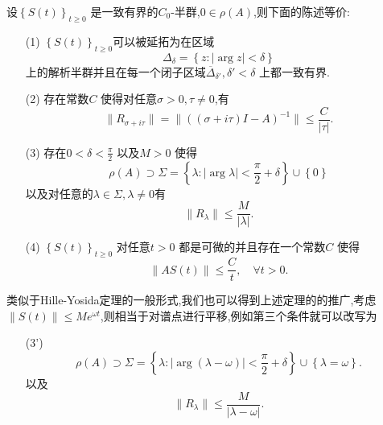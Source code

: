   \begin{theorem}[解析半群的性质]
    设$\left\{S(t)\right\} _{t\ge 0}$ 是一致有界的$C_0$-半群,$0\in \rho (A)$,则下面的陈述等价:
\begin{enumerate}
  \item [(1)]$\left\{S(t)\right\} _{t\ge 0}$可以被延拓为在区域
    \[
    \Delta_{\delta}=\left\{z:|\arg z|<\delta\right\} 
    \] 
    上的解析半群并且在每一个闭子区域$\overline{\Delta}_{\delta'},\delta'<\delta$ 上都一致有界.
  \item [(2)] 存在常数$C$ 使得对任意$\sigma>0,\tau \neq 0$,有
    \begin{equation}
      \|R_{\sigma+i\tau }\|=\|(\left( \sigma+i\tau  \right) I-A)^{-1}\|\le \frac{C}{|\tau |}.
    \end{equation}
  \item [(3)] 存在$0<\delta<\frac{\pi}{2}$ 以及$M>0$ 使得
    \begin{equation}
      \rho(A)\supset \Sigma = \left\{\lambda: |\arg \lambda|<\frac{\pi}{2}+\delta\right\} \cup \left\{0\right\} 
    \end{equation}
    以及对任意的$\lambda \in \Sigma,\lambda\neq 0$有
    \begin{equation}
      \|R_{\lambda}\|\le \frac{M}{|\lambda|}.
    \end{equation}
      \item [(4)] $\left\{S(t)\right\} _{t\ge 0}$ 对任意$t>0$ 都是可微的并且存在一个常数$C$ 使得
	\begin{equation}
	  \|AS(t)\|\le \frac{C}{t},\quad \forall t>0.
	\end{equation}
    \end{enumerate}
  \end{theorem}
  类似于Hille-Yosida定理的一般形式,我们也可以得到上述定理的的推广,考虑$\|S(t)\|\le Me^{\omega t}$,则相当于对谱点进行平移,例如第三个条件就可以改写为
    \begin{enumerate}
      \item [(3')] 
	\begin{equation}
	  \rho(A)\supset \Sigma =\left\{\lambda:|\arg \left( \lambda-\omega \right)|<\frac{\pi}{2}+\delta \right\}\cup \left\{\lambda=\omega\right\}.
	\end{equation}
	以及
	\begin{equation}
	  \|R_\lambda\|\le \frac{M}{|\lambda-\omega|}.
	\end{equation}
    \end{enumerate}
